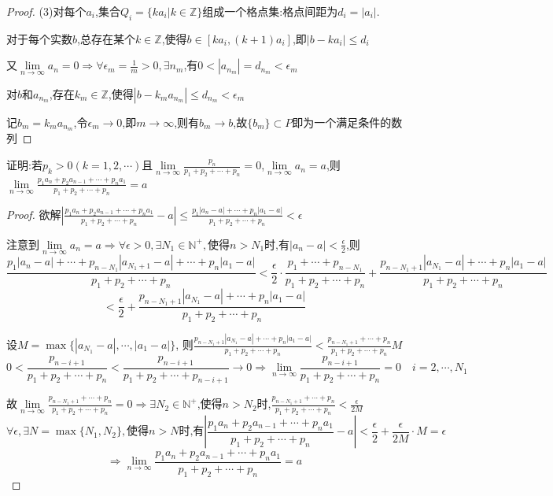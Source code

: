 \begin{proof}
    (3)对每个$a_i$,集合$Q_i=\{ka_i|k\in \mathbb{Z}\}$组成一个格点集:格点间距为$d_i=|a_i|$.

    对于每个实数$b$,总存在某个$k\in \mathbb{Z}$,使得$b\in[ka_i,(k+1)a_i]$,即$|b-ka_i|\le d_i$

    又$\lim\limits_{n\to \infty}a_n=0\Longrightarrow \forall \epsilon_m=\frac{1}{m}>0,\exists n_m$,有$0<|a_{n_m}|=d_{n_m}<\epsilon_m$

    对$b$和$a_{n_m}$,存在$k_m\in \mathbb{Z}$,使得$|b-k_ma_{n_m}|\le d_{n_m}<\epsilon_m$

    记$b_m=k_ma_{n_m}$,令$\epsilon_m\to 0$,即$m\to \infty$,则有$b_m\to b$,故$\{b_m\}\subset P$即为一个满足条件的数列
\end{proof}

\begin{example}
    证明:若$p_k>0(k=1,2,\cdots)$且$\lim\limits_{n\to \infty}\frac{p_n}{p_1+p_2+\cdots+p_n}=0$,$\lim\limits_{n \to \infty} a_n=a$,则$\lim\limits_{n\to \infty}\frac{p_1a_n+p_2a_{n-1}+\cdots+p_na_1}{p_1+p_2+\cdots+p_n}=a$
\end{example}

\begin{proof}

    欲解$|\frac{p_1a_n+p_2a_{n-1}+\cdots+p_na_1}{p_1+p_2+\cdots+p_n}-a|\le \frac{p_1|a_n-a|+\cdots+p_n|a_1-a|}{p_1+p_2+\cdots+p_n}<\epsilon$

    注意到$\lim\limits_{n\to \infty} a_n=a \Longrightarrow\forall \epsilon>0,\exists N_1 \in \mathbb{N}^+,\mbox{使得}n>N_1\mbox{时,有}|a_n-a|<\frac{\epsilon}{2}$,则
    $$\frac{p_1|a_n-a|+\cdots+p_{n-N_1}|a_{N_1+1}-a|+\cdots+p_n|a_1-a|}{p_1+p_2+\cdots+p_n}< \frac{\epsilon}{2}\cdot \frac{p_1+\cdots+p_{n-N_1}}{p_1+p_2+\cdots+p_n}+\frac{p_{n-N_1+1}|a_{N_1}-a|+\cdots+p_n|a_1-a|}{p_1+p_2+\cdots+p_n}$$
    $$<\frac{\epsilon}{2}+\frac{p_{n-N_1+1}|a_{N_1}-a|+\cdots+p_n|a_1-a|}{p_1+p_2+\cdots+p_n}$$

    设$M=\max \{|a_{N_1}-a|,\cdots,|a_1-a|\}$,
    则$\frac{p_{n-N_1+1}|a_{N_1}-a|+\cdots+p_n|a_1-a|}{p_1+p_2+\cdots+p_n}<\frac{p_{n-N_1+1}+\cdots+p_n}{p_1+p_2+\cdots+p_n}M$
    \begin{equation*}
        0<\frac{p_{n-i+1}}{p_1+p_2+\cdots+p_n}<\frac{p_{n-i+1}}{p_1+p_2+\cdots+p_{n-i+1}}\to 0\Longrightarrow \lim\limits_{n\to \infty}\frac{p_{n-i+1}}{p_1+p_2+\cdots+p_n}=0\quad i=2,\cdots,N_1
    \end{equation*}

    故$\lim\limits_{n\to \infty} \frac{p_{n-N_1+1}+\cdots+p_n}{p_1+p_2+\cdots+p_n} = 0
        \Longrightarrow
        \exists N_2\in \mathbb{N}^+$,使得$n>N_2$时,$\frac{p_{n-N_1+1}+\cdots+p_n}{p_1+p_2+\cdots+p_n}<\frac{\epsilon}{2M}$
    $$\forall \epsilon,\exists N=\max \{N_1,N_2\},\mbox{使得}n>N\mbox{时,有}|\frac{p_1a_n+p_2a_{n-1}+\cdots+p_na_1}{p_1+p_2+\cdots+p_n}-a|<\frac{\epsilon}{2}+\frac{\epsilon}{2M}\cdot M=\epsilon$$
    $$\Longrightarrow \lim\limits_{n\to \infty}\frac{p_1a_n+p_2a_{n-1}+\cdots+p_na_1}{p_1+p_2+\cdots+p_n}=a$$
\end{proof}


